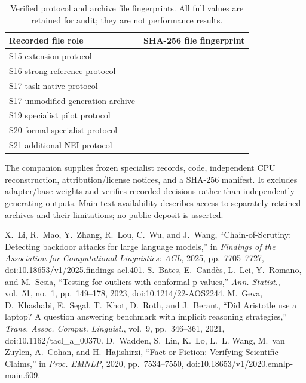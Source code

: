 \documentclass[journal,onecolumn]{IEEEtran}
\begin{document}
\begin{table}[H]
\centering\footnotesize
\caption{Verified protocol and archive file fingerprints. All full values are retained for audit; they are not performance results.}\label{tab:integrity-identifiers}
\setlength{\tabcolsep}{4pt}
\begin{tabular}{@{}L{5.2cm}L{10.0cm}@{}}
\toprule
Recorded file role & SHA-256 file fingerprint\\
\midrule
S15 extension protocol & {\scriptsize{}}\\
S16 strong-reference protocol & {\scriptsize{}}\\
S17 task-native protocol & {\scriptsize{}}\\
S17 unmodified generation archive & {\scriptsize{}}\\
S19 specialist pilot protocol & {\scriptsize{}}\\
S20 formal specialist protocol & {\scriptsize{}}\\
S21 additional NEI protocol & {\scriptsize{}}\\
\bottomrule
\end{tabular}
\end{table}


The companion  supplies frozen specialist records, code, independent CPU reconstruction, attribution/license notices, and a SHA-256 manifest. It excludes adapter/base weights and verifies recorded decisions rather than independently generating outputs. Main-text availability describes access to separately retained archives and their limitations; no public deposit is asserted.

\begin{thebibliography}{99}
 X.~Li, R.~Mao, Y.~Zhang, R.~Lou, C.~Wu, and J.~Wang, ``Chain-of-Scrutiny: Detecting backdoor attacks for large language models,'' in \emph{Findings of the Association for Computational Linguistics: ACL}, 2025, pp.~7705--7727, doi:10.18653/v1/2025.findings-acl.401.
 S.~Bates, E.~Cand\`es, L.~Lei, Y.~Romano, and M.~Sesia, ``Testing for outliers with conformal p-values,'' \emph{Ann. Statist.}, vol.~51, no.~1, pp.~149--178, 2023, doi:10.1214/22-AOS2244.
 M.~Geva, D.~Khashabi, E.~Segal, T.~Khot, D.~Roth, and J.~Berant, ``Did Aristotle use a laptop? A question answering benchmark with implicit reasoning strategies,'' \emph{Trans. Assoc. Comput. Linguist.}, vol.~9, pp.~346--361, 2021, doi:10.1162/tacl\_a\_00370.
 D.~Wadden, S.~Lin, K.~Lo, L.~L. Wang, M.~van Zuylen, A.~Cohan, and H.~Hajishirzi, ``Fact or Fiction: Verifying Scientific Claims,'' in \emph{Proc. EMNLP}, 2020, pp.~7534--7550, doi:10.18653/v1/2020.emnlp-main.609.
\end{thebibliography}
\end{document}
